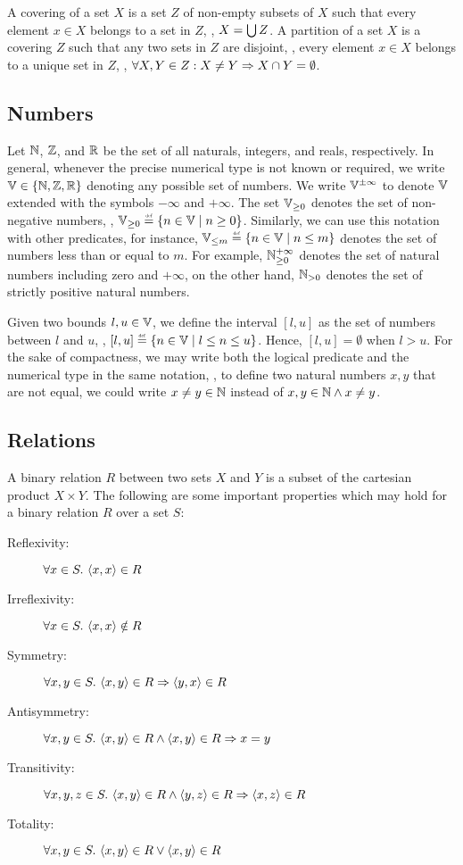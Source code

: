 A covering of a set $X$ is a set $Z$ of non-empty subsets of $X$ such that every element $x \in X$ belongs to a set in $Z$, \ie, $X = \bigcup Z$. A partition of a set $X$ is a covering $Z$ such that any two sets in $Z$ are disjoint, \ie, every element $x \in X$ belongs to a unique set in $Z$, \ie, $\forall X, Y \in Z : X \neq Y \Rightarrow X \cap Y = \emptyset$.


\subsection{Numbers}

Let $\mathbb{N}$, $\mathbb{Z}$, and $\mathbb{R}$ be the set of all naturals, integers, and reals, respectively.
In general, whenever the precise numerical type is not known or required, we write $\mathbb{V}\in\{\mathbb{N}, \mathbb{Z}, \mathbb{R}\}$ denoting any possible set of numbers.
We write $\mathbb{V}^{\pm \infty}$ to denote $\mathbb{V}$ extended with the symbols $-\infty$ and $+\infty$.
The set $\mathbb{V}_{\ge 0}$ denotes the set of non-negative numbers, \ie, $\values_{\ge 0} \defeq \setdef{n \in \values}{n \geq 0}$.
Similarly, we can use this notation with other predicates, for instance, $\values_{\le m} \defeq \setdef{n \in \values}{n \le m}$ denotes the set of numbers less than or equal to $m$.
For example, $\mathbb{N}_{\ge 0}^{+\infty}$ denotes the set of natural numbers including zero and $+\infty$, on the other hand, $\mathbb{N}_{> 0}$ denotes the set of strictly positive natural numbers.

Given two bounds $l, u \in \mathbb{V}$, we define the interval $[l, u]$ as the set of numbers between $l$ and $u$, \ie, $[l, u] \defeq \setdef{n \in \values}{l \le n \le u}$. Hence, $[l, u] = \emptyset$ when $l > u$.
For the sake of compactness, we may write both the logical predicate and the numerical type in the same notation, \eg, to define two natural numbers $x, y$ that are not equal, we could write $x \neq y \in \mathbb{N}$ instead of $x, y \in \mathbb{N} \land x \neq y$.


\subsection{Relations}
A binary relation $R$ between two sets $X$ and $Y$ is a subset of the cartesian product $X \times Y$.
The following are some important properties which may hold for a binary relation $R$ over a set $S$:
\begin{description}
    \item[Reflexivity:] $\forall x \in S.~\langle x, x \rangle \in R$
    \item[Irreflexivity:] $\forall x \in S.~\langle x, x \rangle \notin R$
    \item[Symmetry:] $\forall x, y \in S.~\langle x, y \rangle \in R \Rightarrow \langle y, x \rangle \in R$
    \item[Antisymmetry:] $\forall x, y \in S.~\langle x, y \rangle \in R \wedge \langle x, y \rangle \in R \Rightarrow x = y$
    \item[Transitivity:] $\forall x, y, z \in S.~\langle x, y \rangle \in R \wedge \langle y, z \rangle \in R \Rightarrow \langle x, z \rangle \in R$
    \item[Totality:] $\forall x, y \in S.~\langle x, y \rangle \in R \vee \langle x, y \rangle \in R$
\end{description}

